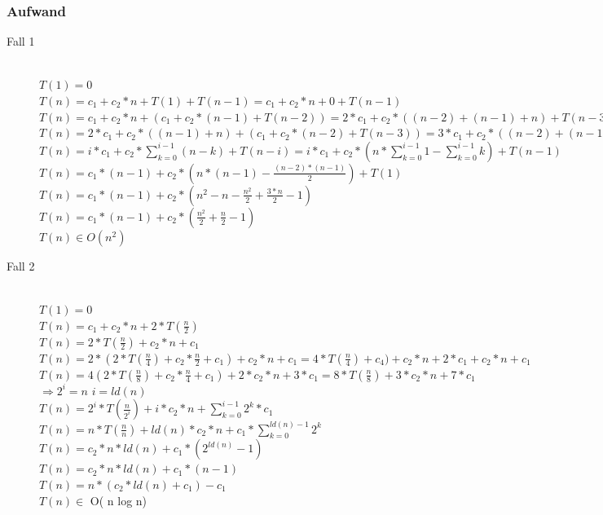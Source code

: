 \documentclass[a4paper,10pt]{article}
\newcommand{\Ra}{\Rightarrow}
\begin{document}
\subsubsection{Aufwand}
\begin{description}
	\item[Fall 1] \hfill \\
		$T(1) = 0$ \\
		$T(n) = c_1 + c_2 * n + T(1) + T(n-1)  = c_1 + c_2 * n + 0 + T(n-1)$ \\
		$T(n) = c_1 + c_2 * n + (c_1 + c_2 * (n - 1) + T(n - 2)) = 2 * c_1 + c_2 * ((n-2) + (n-1) + n) + T(n-3)$ \\
		$T(n) = 2 * c_1 + c_2 * ((n-1) + n) + (c_1 + c_2 * (n-2) + T(n-3)) = 3 * c_1 + c_2 * ( (n - 2) + (n - 1) + n) + T(n-3)$ \\
		$T(n) =  i * c_1 + c_2 * \sum_{k=0}^{i-1} (n-k) + T(n-i) = i * c_1 + c_2 * (n * \sum_{k=0}^{i-1} 1 - \sum_{k=0}^{i-1} k) + T(n-1)$\\
		$T(n) = c_1 * (n-1) + c_2 * (n * (n-1) - \frac{(n-2) * (n-1)}{2}) + T(1)$ \\
		$T(n) = c_1 * (n-1) + c_2 * (n^2-n-\frac{n^2}{2} + \frac{3*n}{2} -1)$ \\
		$T(n) =c_1 * (n-1) + c_2 * (\frac{n^2}{2} + \frac{n}{2} -1)$ \\
		$T(n) \in O(n^2)$
	\item[Fall 2] \hfill \\
		$T(1) = 0$ \\
		$T(n) = c_1 + c_2 * n + 2 * T(\frac{n}{2})$ \\
		$T(n) = 2 * T(\frac{n}{2}) + c_2 * n + c_1$ \\
		$T(n)= 2 *(2 * T(\frac{n}{4})+c_2*\frac{n}{2} + c_1) + c_2 * n + c_1 = 4  * T(\frac{n}{4}) + c_4) + c_2 * n + 2 * c_1 + c_2 * n + c_1$ \\
		$T(n)= 4 ( 2* T(\frac{n}{8}) + c_2 * \frac{n}{4} + c_1) + 2 * c_2*n+3*c_1=8*T(\frac{n}{8}) + 3 *c_2 * n + 7* c_1$\\
		$\Ra 2^i=n$ $i=ld(n)$ \\
		$T(n)=2^i * T(\frac{n}{2^i}) + i * c_2 * n + \sum_{k=0}^{i-1} 2^k*c_1$ \\
		$T(n)= n* T(\frac{n}{n}) +ld(n)*c_2*n+ c_1 * \sum_{k=0}^{ld(n)-1} 2^k$ \\
		$T(n)=c_2 * n * ld(n) + c_1 *(2^{ld(n)} -1)$ \\
		$T(n)=c_2 * n * ld(n) + c_1 * (n-1)$ \\
		$T(n) = n * (c_2 * ld(n) + c_1) - c_1$  \\
		$T(n) \in$ O( n log n)
\end{description}
\end{document}
